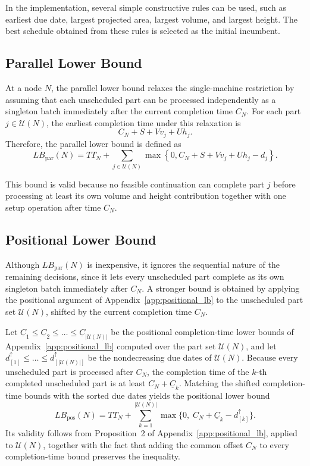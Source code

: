 \documentclass[letterpaper, 10 pt, conference]{ieeeconf}  %
\begin{document}
In the implementation, several simple constructive rules can be used, such
as earliest due date, largest projected area, largest volume, and largest
height. The best schedule obtained from these rules is selected as the
initial incumbent.

\subsection{Parallel Lower Bound}

At a node $N$, the parallel lower bound relaxes the single-machine
restriction by assuming that each unscheduled part can be processed
independently as a singleton batch immediately after the current completion
time $C_N$. For each part $j\in\mathcal{U}(N)$, the earliest completion time
under this relaxation is
\begin{equation}
	C_N+S+Vv_j+Uh_j .
\end{equation}
Therefore, the parallel lower bound is defined as
\begin{equation}
	LB_{\mathrm{par}}(N)
	=
	TT_N
	+
	\sum_{j\in\mathcal{U}(N)}
	\max
	\left\{
	0,
	C_N+S+Vv_j+Uh_j-d_j
	\right\}.
	\label{eq:oracle_lb_par}
\end{equation}

This bound is valid because no feasible continuation can complete part $j$
before processing at least its own volume and height contribution together
with one setup operation after time $C_N$.

\subsection{Positional Lower Bound}

Although $LB_{\mathrm{par}}(N)$ is inexpensive, it ignores the sequential
nature of the remaining decisions, since it lets every unscheduled part
complete as its own singleton batch immediately after $C_N$. A stronger bound
is obtained by applying the positional argument of
Appendix~\ref{app:positional_lb} to the unscheduled part set
$\mathcal{U}(N)$, shifted by the current completion time $C_N$.

Let
$\underline{C}_1\le\underline{C}_2\le\dots\le\underline{C}_{|\mathcal{U}(N)|}$
be the positional completion-time lower bounds of
Appendix~\ref{app:positional_lb} computed over the part set $\mathcal{U}(N)$,
and let
$d^{\uparrow}_{[1]}\le\dots\le d^{\uparrow}_{[|\mathcal{U}(N)|]}$ be the
nondecreasing due dates of $\mathcal{U}(N)$. Because every unscheduled part is
processed after $C_N$, the completion time of the $k$-th completed unscheduled
part is at least $C_N+\underline{C}_k$. Matching the shifted completion-time
bounds with the sorted due dates yields the positional lower bound
\begin{equation}
	LB_{\mathrm{pos}}(N)
	=
	TT_N
	+
	\sum_{k=1}^{|\mathcal{U}(N)|}
	\max\bigl\{0,\;C_N+\underline{C}_k-d^{\uparrow}_{[k]}\bigr\}.
	\label{eq:oracle_lb_pos}
\end{equation}
Its validity follows from Proposition~2 of Appendix~\ref{app:positional_lb},
applied to $\mathcal{U}(N)$, together with the fact that adding the common
offset $C_N$ to every completion-time bound preserves the inequality.
\end{document}
